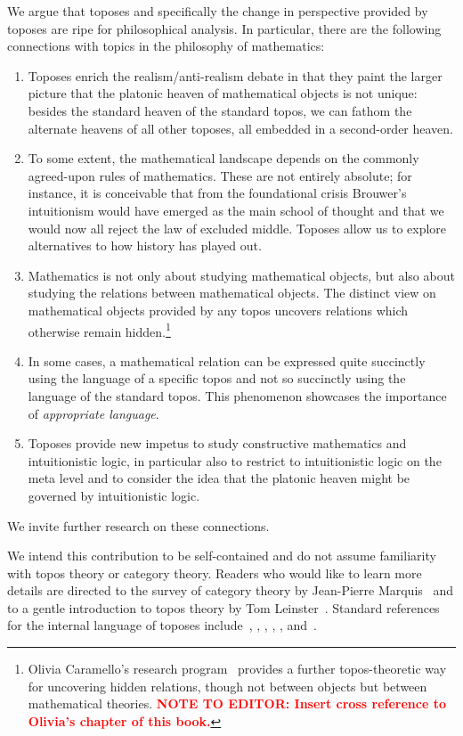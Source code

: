 \documentclass[oneside,reqno]{amsart}
\theoremstyle{definition}
\theoremstyle{plain}
\theoremstyle{remark}
\renewcommand{\_}{\mathpunct{.}\,}
\newcommand{\?}{\,{:}\,}
\begin{document}
We argue that toposes and specifically the change in perspective provided by
toposes are ripe for philosophical analysis. In particular, there are the
following connections with topics in the philosophy of mathematics:
\begin{enumerate}
\item Toposes enrich the realism/anti-realism debate in that they paint the larger
picture that the platonic heaven of mathematical objects is not unique: besides
the standard heaven of the standard topos, we can fathom the alternate
heavens of all other toposes, all embedded in a second-order heaven.
\item To some extent, the mathematical landscape depends on the commonly agreed-upon rules of
mathematics. These are not entirely absolute; for instance, it is conceivable
that from the foundational crisis Brouwer's intuitionism would have emerged as
the main school of thought and that we would now all reject the law of excluded
middle. Toposes allow us to explore alternatives to how history
has played out.
\item Mathematics is not only about studying mathematical objects, but also
about studying the relations between mathematical objects. The distinct view
on mathematical objects provided by any topos uncovers relations which
otherwise remain hidden.\footnote{Olivia Caramello's research
program~\cite{caramello:tst} provides a further topos-theoretic way for
uncovering hidden relations, though not between objects but between mathematical
theories. \textbf{\textcolor{red}{NOTE TO EDITOR: Insert cross reference to Olivia's chapter of
this book.}}}
\item In some cases, a mathematical relation can be expressed quite succinctly
using the language of a specific topos and not so succinctly using the language
of the standard topos. This phenomenon showcases the importance of
\emph{appropriate language}.
\item Toposes provide new impetus to study constructive mathematics and
intuitionistic logic, in particular also to restrict to intuitionistic
logic on the meta level and to consider the idea that the platonic heaven might
be governed by intuitionistic logic.
\end{enumerate}
We invite further research on these connections.

We intend this contribution to be self-contained and do not assume familiarity with
topos theory or category theory. Readers who would like to learn more details
are directed to the survey of category theory by Jean-Pierre
Marquis~\cite{sep:category-theory} and to a gentle introduction to topos theory
by Tom Leinster~\cite{leinster:introduction}. Standard references for the internal
language of toposes include~\cite[Chapter~VI]{moerdijk-maclane:sheaves-logic},
\cite[Chapter~14]{goldblatt:topoi},
\cite{caramello:preliminaries}, \cite{streicher:ctcl}, \cite{shulman:categorical-logic},
\cite[Chapter~6]{borceux:handbook3} and~\cite[Part~D]{johnstone:elephant}.
\end{document}
